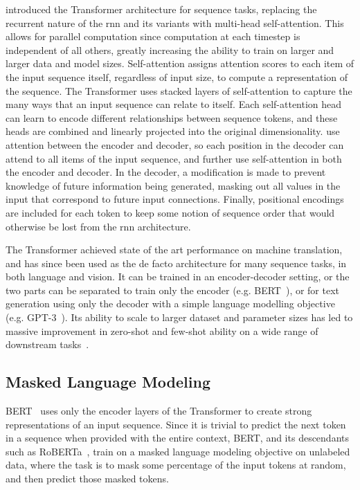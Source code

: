 \citet{vaswani2017attention} introduced the Transformer architecture for
sequence tasks, replacing the recurrent nature of the \acrshort{rnn} and its
variants with multi-head self-attention. This allows for parallel computation
since computation at each timestep is independent of all others, greatly
increasing the ability to train on larger and larger data and model sizes.
Self-attention assigns attention scores to each item of the input sequence
itself, regardless of input size, to compute a representation of the sequence.
The Transformer uses stacked layers of self-attention to capture the many ways
that an input sequence can relate to itself. Each self-attention head can learn
to encode different relationships between sequence tokens, and these heads are
combined and linearly projected into the original dimensionality.
\citet{vaswani2017attention} use attention between the encoder and decoder, so
each position in the decoder can attend to all items of the input sequence, and
further use self-attention in both the encoder and decoder. In the decoder, a
modification is made to prevent knowledge of future information being
generated, masking out all values in the input that correspond to future input
connections. Finally, positional encodings are included for each token to keep
some notion of sequence order that would otherwise be lost from the
\acrshort{rnn} architecture. 

The Transformer achieved state of the art performance on machine translation,
and has since been used as the de facto architecture for many sequence tasks,
in both language and vision. It can be trained in an encoder-decoder setting,
or the two parts can be separated to train only the encoder (e.g.
BERT~\citep{devlin2019bert}), or for text generation using only the decoder
with a simple language modelling objective (e.g. GPT-3~\citep{brown2020gpt3}).
Its ability to scale to larger dataset and parameter sizes has led to massive
improvement in zero-shot and few-shot ability on a wide range of downstream
tasks~\citep{hoffmann2022chinchilla}.

\subsection{Masked Language Modeling}
\label{ssec:mlm}

BERT~\citep{devlin2019bert} uses only the encoder layers of the Transformer to
create strong representations of an input sequence. Since it is trivial to
predict the next token in a sequence when provided with the entire context,
BERT, and its descendants such as RoBERTa~\citep{liu2020roberta}, train on a
masked language modeling objective on unlabeled data, where the task is to mask
some percentage of the input tokens at random, and then predict those masked
tokens.

